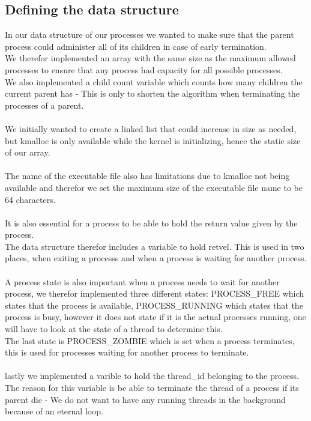 \documentclass[a4paper,12pt,danish]{report}
\begin{document}
\subsection{Defining the data structure}
In our data structure of our processes we wanted to make sure that the parent process could administer all of its children in case of early termination.
\\
We therefor implemented an array with the same size as the maximum allowed processes to ensure that any process had capacity for all possible processes.
\\
We also implemented a child count variable which counts how many children the current parent has - This is only to shorten the algorithm when terminating the processes of a parent.
\\
\\
We initially wanted to create a linked list that could increase in size as needed, but kmalloc is only available while the kernel is initializing, hence the static size of our array.
\\
\\
The name of the executable file also has limitations due to kmalloc not being available and therefor we set the maximum size of the executable file name to be 64 characters.
\\
\\
It is also essential for a process to be able to hold the return value given by the process.
\\
The data structure therefor includes a variable to hold retvel. This is used in two places, when exiting a processs and when a process is waiting for another process.
\\
\\
A process state is also important when a process needs to wait for another process, we therefor implemented three different states: PROCESS\_FREE which states that the process is available, PROCESS\_RUNNING which states that the process is busy, however it does not state if it is the actual processes running, one will have to look at the state of a thread to determine this.
\\
The last state is PROCESS\_ZOMBIE which is set when a process terminates, this is used for processes waiting for another process to terminate.
\\
\\
lastly we implemented a varible to hold the thread\_id belonging to the process.
\\
The reason for this variable is be able to terminate the thread of a process if its parent die - We do not want to have any running threads in the background because of an eternal loop.
\end{document}
